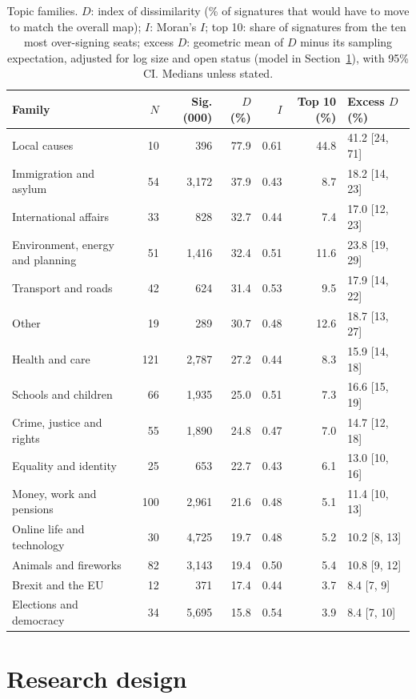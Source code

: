 \documentclass[11pt,a4paper]{article}
\begin{document}
\begin{table}[tbp]\centering\small\caption{Topic families. $D$: index of dissimilarity (\% of signatures that would have to move to match the overall map); $I$: Moran's $I$; top 10: share of signatures from the ten most over-signing seats; excess $D$: geometric mean of $D$ minus its sampling expectation, adjusted for log size and open status (model in Section~\ref{sec:design}), with 95\% CI. Medians unless stated.}\label{tab:fam}\footnotesize\setlength{\tabcolsep}{3pt}\begin{tabular}{lrrrrrl}\toprule Family & $N$ & Sig. (000) & $D$ (\%) & $I$ & Top 10 (\%) & Excess $D$ (\%)\\\midrule
Local causes & 10 & 396 & 77.9 & 0.61 & 44.8 & 41.2 [24, 71]\\
Immigration and asylum & 54 & 3,172 & 37.9 & 0.43 & 8.7 & 18.2 [14, 23]\\
International affairs & 33 & 828 & 32.7 & 0.44 & 7.4 & 17.0 [12, 23]\\
Environment, energy and planning & 51 & 1,416 & 32.4 & 0.51 & 11.6 & 23.8 [19, 29]\\
Transport and roads & 42 & 624 & 31.4 & 0.53 & 9.5 & 17.9 [14, 22]\\
Other & 19 & 289 & 30.7 & 0.48 & 12.6 & 18.7 [13, 27]\\
Health and care & 121 & 2,787 & 27.2 & 0.44 & 8.3 & 15.9 [14, 18]\\
Schools and children & 66 & 1,935 & 25.0 & 0.51 & 7.3 & 16.6 [15, 19]\\
Crime, justice and rights & 55 & 1,890 & 24.8 & 0.47 & 7.0 & 14.7 [12, 18]\\
Equality and identity & 25 & 653 & 22.7 & 0.43 & 6.1 & 13.0 [10, 16]\\
Money, work and pensions & 100 & 2,961 & 21.6 & 0.48 & 5.1 & 11.4 [10, 13]\\
Online life and technology & 30 & 4,725 & 19.7 & 0.48 & 5.2 & 10.2 [8, 13]\\
Animals and fireworks & 82 & 3,143 & 19.4 & 0.50 & 5.4 & 10.8 [9, 12]\\
Brexit and the EU & 12 & 371 & 17.4 & 0.44 & 3.7 & 8.4 [7, 9]\\
Elections and democracy & 34 & 5,695 & 15.8 & 0.54 & 3.9 & 8.4 [7, 10]\\
\bottomrule\end{tabular}\end{table}

\section{Research design}\label{sec:design}
\end{document}
